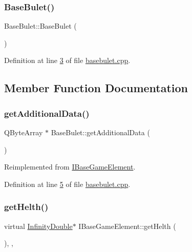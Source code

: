 \subsubsection{\texorpdfstring{Base\+Bulet()}{BaseBulet()}}
{\footnotesize\ttfamily Base\+Bulet\+::\+Base\+Bulet (\begin{DoxyParamCaption}{ }\end{DoxyParamCaption})}



Definition at line \hyperlink{a00032_source_l00003}{3} of file \hyperlink{a00032_source}{basebulet.\+cpp}.



\subsection{Member Function Documentation}
\mbox{\label{a00153_a307a62b59328f9e2a0530f559aba0dcb}} 
\subsubsection{\texorpdfstring{get\+Additional\+Data()}{getAdditionalData()}}
{\footnotesize\ttfamily Q\+Byte\+Array $\ast$ Base\+Bulet\+::get\+Additional\+Data (\begin{DoxyParamCaption}{ }\end{DoxyParamCaption})\hspace{0.3cm}{\ttfamily [virtual]}}



Reimplemented from \hyperlink{a00137_aaf3cdf5f4e893704c9f17c524a1f0a8c}{I\+Base\+Game\+Element}.



Definition at line \hyperlink{a00032_source_l00005}{5} of file \hyperlink{a00032_source}{basebulet.\+cpp}.

\mbox{\label{a00137_a13a00e39ece3e20e3f5e049224da8d40}} 
\subsubsection{\texorpdfstring{get\+Helth()}{getHelth()}}
{\footnotesize\ttfamily virtual \hyperlink{a00161}{Infinity\+Double}$\ast$ I\+Base\+Game\+Element\+::get\+Helth (\begin{DoxyParamCaption}{ }\end{DoxyParamCaption})\hspace{0.3cm}{\ttfamily [inline]}, {\ttfamily [virtual]}, {\ttfamily [inherited]}}



